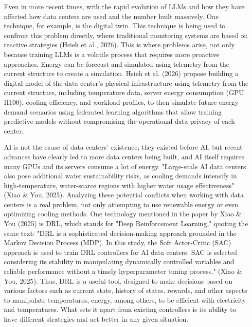 \documentclass[conference]{IEEEtran}
\begin{document}
Even in more recent times, with the rapid evolution of LLMs and how they have affected how data centers are used and the number built massively. One technique, for example, is the digital twin. This technique is being used to confront this problem directly, where traditional monitoring systems are based on reactive strategies (Hsieh et al., 2026). This is where problems arise, not only because training LLMs is a volatile process that requires more proactive approaches. Energy can be forecast and simulated using telemetry from the current structure to create a simulation. Hsieh et al. (2026) propose building a digital model of the data center's physical infrastructure using telemetry from the current structure, including temperature data, server energy consumption (GPU H100), cooling efficiency, and workload profiles, to then simulate future energy demand scenarios using federated learning algorithms that allow training predictive models without compromising the operational data privacy of each center.

AI is not the cause of data centers' existence; they existed before AI, but recent advances have clearly led to more data centers being built, and AI itself requires many GPUs and its servers consume a lot of energy. "Large-scale AI data centers also pose additional water sustainability risks, as cooling demands intensify in high-temperature, water-scarce regions with higher water usage effectiveness" (Xiao \& You, 2025). Analyzing these potential conflicts when working with data centers is a real problem, not only attempting to use renewable energy or even optimizing cooling methods. One technology mentioned in the paper by Xiao \& You (2025) is DRL, which stands for "Deep Reinforcement Learning," quoting the same text: "DRL is a sophisticated decision-making approach grounded in the Markov Decision Process (MDP). In this study, the Soft Actor-Critic (SAC) approach is used to train DRL controllers for AI data centers. SAC is selected considering its stability in manipulating dynamically controlled variables and reliable performance without a timely hyperparameter tuning process." (Xiao \& You, 2025). Thus, DRL is a useful tool, designed to make decisions based on various factors such as current state, history of states, rewards, and other aspects to manipulate temperatures, energy, among others, to be efficient with electricity and temperatures. What sets it apart from existing controllers is its ability to have different strategies and act better in any given situation.
\end{document}
